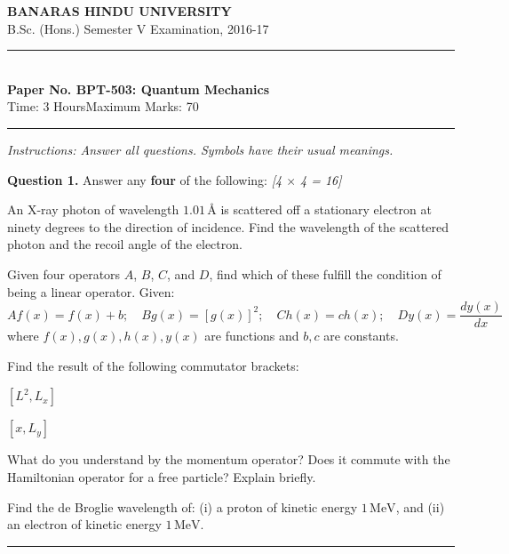 \documentclass[11pt,a4paper]{article}
\newcommand{\pts}[1]{\hfill   \textit{[#1]}}
\begin{document}
\begin{center}
  {\large\bfseries BANARAS HINDU UNIVERSITY}\\[2pt]
  {\normalsize B.Sc. (Hons.) Semester V Examination, 2016-17}\\[6pt]
  \rule{0.8\linewidth}{0.5pt}\\[6pt]
  {\large\bfseries Paper No. BPT-503: Quantum Mechanics}\\[4pt]
  {\normalsize Time: 3 Hours\hfill Maximum Marks: 70}
\end{center}
\rule{\linewidth}{0.4pt}
\smallskip



\noindent   \textit{Instructions: Answer all questions. Symbols have their usual meanings.}
\bigskip




\noindent   \textbf{Question 1.} Answer any   \textbf{four} of the following: \pts{4 $ \times$ 4 = 16}

\begin{parts}
  \item An X-ray photon of wavelength $1.01\, \text{\AA}$ is scattered off a stationary electron at ninety degrees to the direction of incidence. Find the wavelength of the scattered photon and the recoil angle of the electron.
  \item Given four operators $A$, $B$, $C$, and $D$, find which of these fulfill the condition of being a linear operator. Given:
    \[ Af(x) = f(x) + b; \quad Bg(x) = [g(x)]^2; \quad Ch(x) = c h(x); \quad Dy(x) = \frac{dy(x)}{dx} \]
    where $f(x), g(x), h(x), y(x)$ are functions and $b, c$ are constants.
  \item Find the result of the following commutator brackets:
    
\begin{parts}
      \item $[L^2, L_x]$
      \item $[x, L_y]$
    \end{parts}
  \item What do you understand by the momentum operator? Does it commute with the Hamiltonian operator for a free particle? Explain briefly.
  \item Find the de Broglie wavelength of: (i) a proton of kinetic energy $1\, \text{MeV}$, and (ii) an electron of kinetic energy $1\, \text{MeV}$.
\end{parts}

\medskip\rule{\linewidth}{0.2pt}
\end{document}
